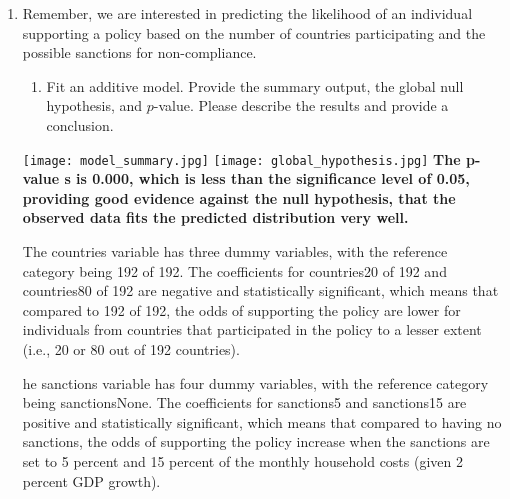 \documentclass[12pt,letterpaper]{article}
\begin{document}
\begin{enumerate}
	\item
	Remember, we are interested in predicting the likelihood of an individual supporting a policy based on the number of countries participating and the possible sanctions for non-compliance.
	\begin{enumerate}
		\item [] Fit an additive model. Provide the summary output, the global null hypothesis, and $p$-value. Please describe the results and provide a conclusion.
	\end{enumerate}
	
	 

\texttt{[image: model\_summary.jpg]}
\linebreak
\texttt{[image: global\_hypothesis.jpg]}
\linebreak
\textbf{The p-value s is 0.000, which is less than the significance level of 0.05, providing good evidence against the null hypothesis, that the observed data fits the predicted distribution very well. }

The countries variable has three dummy variables, with the reference category being 192 of 192. The coefficients for countries20 of 192 and countries80 of 192 are negative and statistically significant, which means that compared to 192 of 192, the odds of supporting the policy are lower for individuals from countries that participated in the policy to a lesser extent (i.e., 20 or 80 out of 192 countries). 

he sanctions variable has four dummy variables, with the reference category being sanctionsNone. The coefficients for sanctions5 and sanctions15 are positive and statistically significant, which means that compared to having no sanctions, the odds of supporting the policy increase when the sanctions are set to 5 percent and 15 percent of the monthly household costs (given 2 percent GDP growth).


\end{enumerate}
\end{document}
